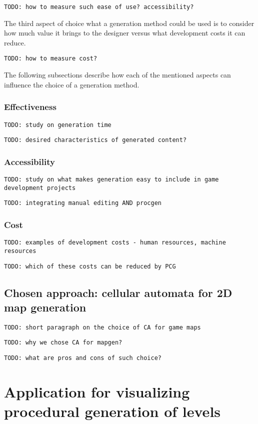 \documentclass[12pt]{report}
\newcommand{\todo}[1]{}
\renewcommand{\todo}[1]{{\color{red} \par \noindent \footnotesize \texttt{TODO: {#1} }}}
\begin{document}
\todo{how to measure such ease of use? accessibility? }

The third aspect of choice what a generation method could be used is to consider how much value it brings to the designer versus what development costs it can reduce.

\todo{how to measure cost?}

The following subsections describe how each of the mentioned aspects can influence the choice of a generation method.

\subsection{Effectiveness} 
\todo{study on generation time}
\todo{desired characteristics of generated content?}

\subsection{Accessibility} 

\todo{study on what makes generation easy to include in game development projects}
\todo{integrating manual editing AND procgen}

\subsection{Cost} 
\todo{examples of development costs - human resources, machine resources}
\todo{which of these costs can be reduced by PCG}




\section{Chosen approach: cellular automata for 2D map generation}

\todo{short paragraph on the choice of CA for game maps}
\todo{why we chose CA for mapgen?}
\todo{what are pros and cons of such choice?}

\chapter{Application for visualizing procedural generation of levels} \label{rozdzial.praktyka} 
\end{document}
